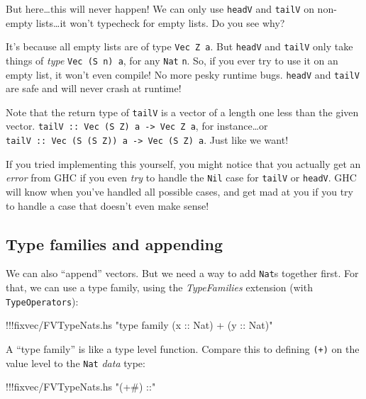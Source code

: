 \documentclass[]{article}
\newenvironment{Shaded}{}{}
\newcommand{\StringTok}[1]{\textcolor[rgb]{0.25,0.44,0.63}{{#1}}}
\newcommand{\FunctionTok}[1]{\textcolor[rgb]{0.02,0.16,0.49}{{#1}}}
\newcommand{\NormalTok}[1]{{#1}}
\begin{document}
But here\ldots{}this will never happen! We can only use \texttt{headV}
and \texttt{tailV} on non-empty lists\ldots{}it won't typecheck for
empty lists. Do you see why?

It's because all empty lists are of type \texttt{Vec\ Z\ a}. But
\texttt{headV} and \texttt{tailV} only take things of \emph{type}
\texttt{Vec\ (S\ n)\ a}, for any \texttt{Nat} \texttt{n}. So, if you
ever try to use it on an empty list, it won't even compile! No more
pesky runtime bugs. \texttt{headV} and \texttt{tailV} are safe and will
never crash at runtime!

Note that the return type of \texttt{tailV} is a vector of a length one
less than the given vector.
\texttt{tailV\ ::\ Vec\ (S\ Z)\ a\ -\textgreater{}\ Vec\ Z\ a}, for
instance\ldots{}or
\texttt{tailV\ ::\ Vec\ (S\ (S\ Z))\ a\ -\textgreater{}\ Vec\ (S\ Z)\ a}.
Just like we want!

If you tried implementing this yourself, you might notice that you
actually get an \emph{error} from GHC if you even \emph{try} to handle
the \texttt{Nil} case for \texttt{tailV} or \texttt{headV}. GHC will
know when you've handled all possible cases, and get mad at you if you
try to handle a case that doesn't even make sense!

\subsection{Type families and
appending}\label{type-families-and-appending}

We can also ``append'' vectors. But we need a way to add \texttt{Nat}s
together first. For that, we can use a type family, using the
\emph{TypeFamilies} extension (with \texttt{TypeOperators}):

\begin{Shaded}
\begin{Highlighting}[]
\FunctionTok{!!!}\NormalTok{fixvec}\FunctionTok{/}\NormalTok{FVTypeNats.hs }\StringTok{"type family (x :: Nat) + (y :: Nat)"}
\end{Highlighting}
\end{Shaded}

A ``type family'' is like a type level function. Compare this to
defining \texttt{(+)} on the value level to the \texttt{Nat} \emph{data}
type:

\begin{Shaded}
\begin{Highlighting}[]
\FunctionTok{!!!}\NormalTok{fixvec}\FunctionTok{/}\NormalTok{FVTypeNats.hs }\StringTok{"(+#) ::"}
\end{Highlighting}
\end{Shaded}
\end{document}
